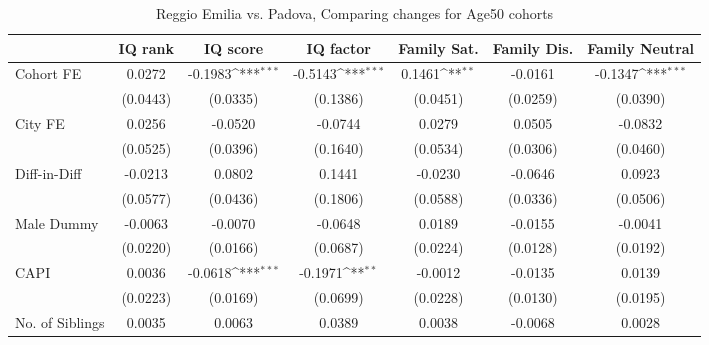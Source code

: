 \begin{table}[htbp]\centering
\def\sym#1{\ifmmode^{#1}\else\(^{#1}\)\fi}
\caption{Reggio Emilia vs. Padova, Comparing changes for Age50 cohorts}
\begin{tabular}{l*{6}{c}}
\toprule
            &\multicolumn{1}{c}{IQ rank}&\multicolumn{1}{c}{IQ score}&\multicolumn{1}{c}{IQ factor}&\multicolumn{1}{c}{Family Sat.}&\multicolumn{1}{c}{Family Dis.}&\multicolumn{1}{c}{Family Neutral}\\
\midrule
Cohort FE   &      0.0272         &     -0.1983\sym{***}&     -0.5143\sym{***}&      0.1461\sym{**} &     -0.0161         &     -0.1347\sym{***}\\
            &    (0.0443)         &    (0.0335)         &    (0.1386)         &    (0.0451)         &    (0.0259)         &    (0.0390)         \\
\addlinespace
City FE     &      0.0256         &     -0.0520         &     -0.0744         &      0.0279         &      0.0505         &     -0.0832         \\
            &    (0.0525)         &    (0.0396)         &    (0.1640)         &    (0.0534)         &    (0.0306)         &    (0.0460)         \\
\addlinespace
Diff-in-Diff&     -0.0213         &      0.0802         &      0.1441         &     -0.0230         &     -0.0646         &      0.0923         \\
            &    (0.0577)         &    (0.0436)         &    (0.1806)         &    (0.0588)         &    (0.0336)         &    (0.0506)         \\
\addlinespace
Male Dummy  &     -0.0063         &     -0.0070         &     -0.0648         &      0.0189         &     -0.0155         &     -0.0041         \\
            &    (0.0220)         &    (0.0166)         &    (0.0687)         &    (0.0224)         &    (0.0128)         &    (0.0192)         \\
\addlinespace
CAPI        &      0.0036         &     -0.0618\sym{***}&     -0.1971\sym{**} &     -0.0012         &     -0.0135         &      0.0139         \\
            &    (0.0223)         &    (0.0169)         &    (0.0699)         &    (0.0228)         &    (0.0130)         &    (0.0195)         \\
\addlinespace
No. of Siblings&      0.0035         &      0.0063         &      0.0389         &      0.0038         &     -0.0068         &      0.0028         \\

\end{tabular}
\end{table}
